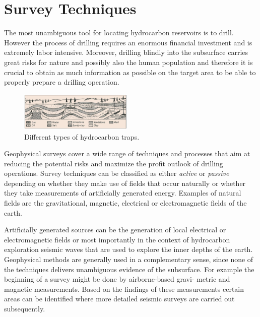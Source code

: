 \documentclass[twocolumn]{article}
\begin{document}
\section{Survey Techniques}
The most unambiguous tool for locating hydrocarbon reservoirs is to drill. However the process of drilling requires an enormous financial investment and is extremely labor intensive. Moreover, drilling blindly into the subsurface carries great risks for nature and possibly also the human population and therefore it is crucial to obtain as much information as possible on the target area to be able to properly prepare a drilling operation. 
\begin{figure}[htb]
        \centering
        \includegraphics[width=0.48\textwidth]{hydrocarbon}
        \caption{Different types of hydrocarbon traps.}
        \label{hydrocarbon}
\end{figure}

Geophysical surveys cover a wide range of techniques and processes that aim at reducing the potential risks and maximize the profit outlook of drilling operations. Survey techniques can be classified as either \textit{active} or \textit{passive} depending on whether they make use of fields that occur naturally or whether they take measurements of artificially generated energy. Examples of natural fields are the gravitational, magnetic, electrical or electromagnetic fields of the earth.

Artificially generated sources can be the generation of local electrical or electromagnetic fields or most importantly in the context of hydrocarbon exploration seismic waves that are used to explore the inner depths of the earth. Geophysical methods are generally used in a complementary sense, since none of the techniques delivers unambiguous evidence of the subsurface. For example the beginning of a survey might be done by airborne-based gravi- metric and magnetic measurements. Based on the findings of these measurements certain areas can be identified where more detailed seismic surveys are carried out subsequently.
\end{document}
